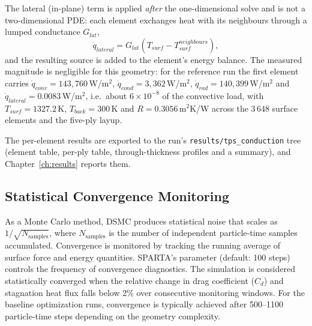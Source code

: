 The lateral (in-plane) term is applied \emph{after} the one-dimensional solve and is not a two-dimensional PDE: each element exchanges heat with its neighbours through a lumped conductance $G_{lat}$,
\begin{equation}
    \dot{q}_{lateral} = G_{lat}\left(T_{surf}-T_{surf}^{neighbours}\right),
    \label{eq:lateral}
\end{equation}
and the resulting source is added to the element's energy balance. The measured magnitude is negligible for this geometry: for the reference run the first element carries $\dot{q}_{conv}=143{,}760$\,W/m$^2$, $\dot{q}_{cond}=3{,}362$\,W/m$^2$, $\dot{q}_{rad}=140{,}399$\,W/m$^2$ and $\dot{q}_{lateral}=0.0083$\,W/m$^2$, i.e.\ about $6\times10^{-8}$ of the convective load, with $T_{surf}=1327.2$\,K, $T_{back}=300$\,K and $R=0.3056$\,m$^2$K/W across the 3\,648 surface elements and the five-ply layup.

The per-element results are exported to the run's \texttt{results/tps\_conduction} tree (element table, per-ply table, through-thickness profiles and a summary), and Chapter~\ref{ch:results} reports them.


\subsection{Statistical Convergence Monitoring}
As a Monte Carlo method, DSMC produces statistical noise that scales as $1/\sqrt{N_{\text{samples}}}$, where $N_{\text{samples}}$ is the number of independent particle-time samples accumulated. Convergence is monitored by tracking the running average of surface force and energy quantities. SPARTA's \texttt{} parameter (default: 100 steps) controls the frequency of convergence diagnostics. The simulation is considered statistically converged when the relative change in drag coefficient ($C_d$) and stagnation heat flux falls below 2\% over consecutive monitoring windows. For the baseline optimization runs, convergence is typically achieved after 500--1100 particle-time steps depending on the geometry complexity.


